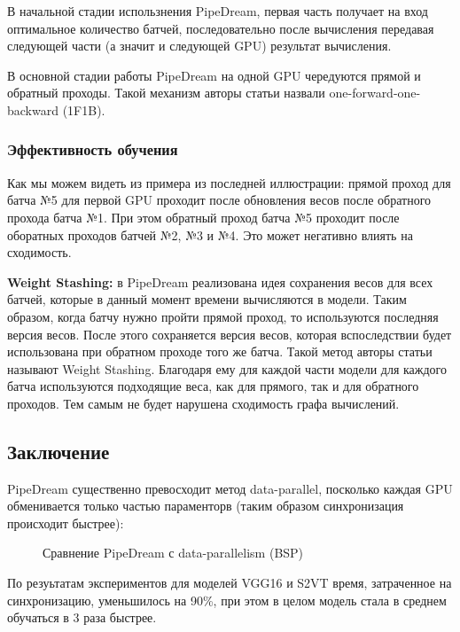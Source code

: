 \indent\setlength{\parindent}{1em}  
В начальной стадии использнения PipeDream, первая часть получает на вход оптимальное количество батчей, последовательно после вычисления передавая следующей части (а значит и следующей GPU) результат вычисления. 

\indent\setlength{\parindent}{1em}  
В основной стадии работы PipeDream на одной GPU чередуются прямой и обратный проходы. Такой механизм авторы статьи назвали one-forward-one-backward (1F1B).

\newpage
\subsubsection{Эффективность обучения}
\indent\setlength{\parindent}{1em} 
Как мы можем видеть из примера из последней иллюстрации: прямой проход для батча №5 для первой GPU проходит после обновления весов после обратного прохода батча №1. При этом обратный проход батча №5 проходит после оборатных проходов батчей №2, №3 и №4. Это может негативно влиять на сходимость.

\indent\setlength{\parindent}{1em}
\textbf{Weight Stashing:} в PipeDream реализована идея сохранения весов для всех батчей, которые в данный момент времени вычисляются в модели. Таким образом, когда батчу нужно пройти прямой проход, то используются последняя версия весов. После этого сохраняется версия весов, которая вспоследствии будет использована при обратном проходе того же батча. Такой метод авторы статьи называют Weight Stashing. Благодаря ему для каждой части модели для каждого батча используются подходящие веса, как для прямого, так и для обратного проходов. Тем самым не будет нарушена сходимость графа вычислений.

\subsection{Заключение}
\indent\setlength{\parindent}{1em} 
PipeDream существенно превосходит метод data-parallel, посколько каждая GPU обменивается только частью параменторв (таким образом синхронизация происходит быстрее):

\begin{figure}[h]%
	\centering
	\caption{Сравнение PipeDream с data-parallelism (BSP)}
	\label{framework} %
\end{figure}

\indent\setlength{\parindent}{1em} 
По резуьтатам экспериментов для моделей VGG16 и S2VT время, затраченное на синхронизацию, уменьшилось на 90\%, при этом в целом модель стала в среднем обучаться в 3 раза быстрее.